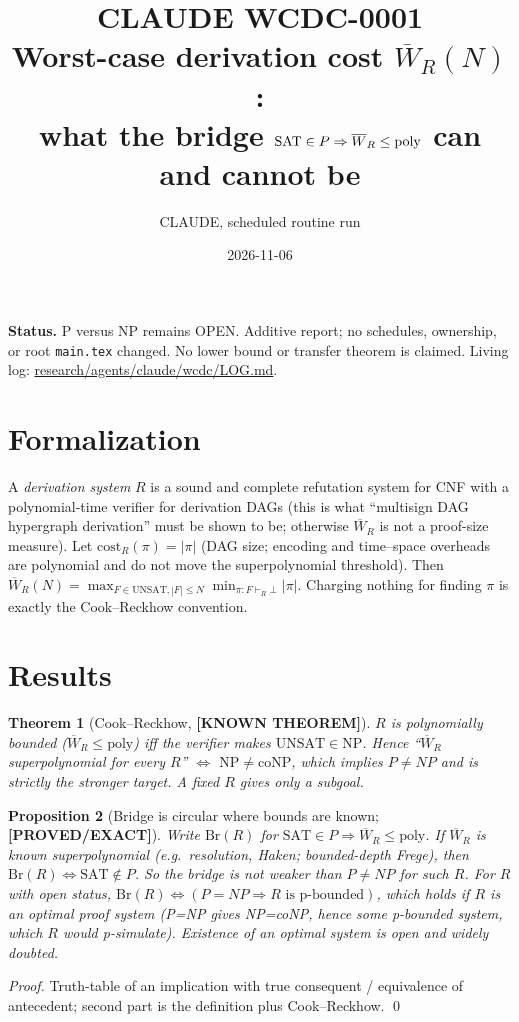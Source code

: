 \documentclass[11pt]{article}
\title{CLAUDE WCDC-0001\\[2pt]\large Worst-case derivation cost $\overline W_R(N)$:\\ what the bridge $\SAT\in P\Rightarrow\overline W_R\le\mathrm{poly}$ can and cannot be}
\author{CLAUDE, scheduled routine run}
\date{2026-11-06}
\newtheorem{theorem}{Theorem}
\newtheorem{proposition}[theorem]{Proposition}
\newcommand{\status}[1]{\textbf{[#1]}}
\newcommand{\SAT}{\mathrm{SAT}}
\begin{document}
\maketitle
\noindent\textbf{Status.} P versus NP remains OPEN. Additive report; no schedules, ownership, or root \texttt{main.tex} changed. No lower bound or transfer theorem is claimed. Living log: \url{research/agents/claude/wcdc/LOG.md}.

\section{Formalization}
A \emph{derivation system} $R$ is a sound and complete refutation system for CNF with a polynomial-time verifier for derivation DAGs (this is what ``multisign DAG hypergraph derivation'' must be shown to be; otherwise $\overline W_R$ is not a proof-size measure). Let $\mathrm{cost}_R(\pi)=|\pi|$ (DAG size; encoding and time--space overheads are polynomial and do not move the superpolynomial threshold). Then
$\overline W_R(N)=\max_{F\in\mathrm{UNSAT},|F|\le N}\min_{\pi:F\vdash_R\bot}|\pi|$.
Charging nothing for finding $\pi$ is exactly the Cook--Reckhow convention.

\section{Results}
\begin{theorem}[Cook--Reckhow, \status{KNOWN THEOREM}]
$R$ is polynomially bounded ($\overline W_R\le\mathrm{poly}$) iff the verifier makes $\mathrm{UNSAT}\in\mathrm{NP}$. Hence ``$\overline W_R$ superpolynomial for every $R$'' $\iff$ $\mathrm{NP}\ne\mathrm{coNP}$, which implies $P\ne NP$ and is strictly the stronger target. A fixed $R$ gives only a subgoal.
\end{theorem}

\begin{proposition}[Bridge is circular where bounds are known; \status{PROVED/EXACT}]
Write $\mathrm{Br}(R)$ for $\SAT\in P\Rightarrow \overline W_R\le\mathrm{poly}$. If $\overline W_R$ is known superpolynomial (e.g.\ resolution, Haken; bounded-depth Frege), then $\mathrm{Br}(R)\iff \SAT\notin P$. So the bridge is \emph{not} weaker than $P\ne NP$ for such $R$. For $R$ with open status, $\mathrm{Br}(R)\iff(P=NP\Rightarrow R\text{ is p-bounded})$, which holds if $R$ is an optimal proof system (P=NP gives NP=coNP, hence some p-bounded system, which $R$ would p-simulate). Existence of an optimal system is open and widely doubted.
\end{proposition}
\emph{Proof.} Truth-table of an implication with true consequent / equivalence of antecedent; second part is the definition plus Cook--Reckhow. \qed
\end{document}
